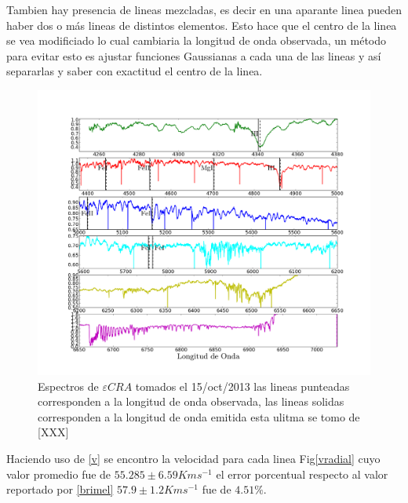 \documentclass[Proceedings]{ascelike}
\begin{document}
Tambien hay presencia de lineas mezcladas, es decir en una aparante linea pueden haber dos o m\'as lineas de distintos 
elementos. Esto hace que el centro de la linea se vea modificiado lo cual cambiaria la longitud de onda observada, 
un m\'etodo para evitar esto es ajustar funciones Gaussianas a cada una de las lineas y as\'i separarlas y saber con exactitud el centro de la linea.\\

\begin{figure}
\includegraphics[scale=0.3]{spectra.png}
\caption{Espectros de $\varepsilon CRA$ tomados el 15/oct/2013
las lineas punteadas corresponden a la longitud de onda observada, las 
lineas solidas corresponden a la longitud de onda emitida esta ulitma se tomo de [XXX]\label{espectra}}
\end{figure}

Haciendo uso de \eqref{v} se encontro la velocidad para cada linea Fig\ref{vradial} cuyo valor promedio fue de $55.285 \pm 6.59 Km s^{-1}$ el error porcentual respecto al valor reportado por \ref{brimel} $57.9 \pm 1.2 Kms^{-1}$ fue de $4.51\%$. \\
\end{document}
